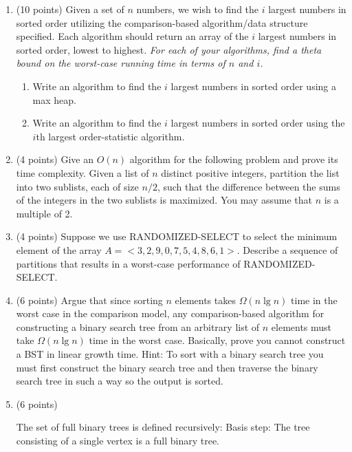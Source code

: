 \documentclass[3]{cs430homework}
\begin{document}
\maketitle

\begin{enumerate}[label=\arabic*.]
	\item (10 points) Given a set of $n$ numbers, we wish to find the $i$ largest numbers in sorted order utilizing the comparison-based algorithm/data structure specified. Each algorithm should return an array of the $i$ largest numbers in sorted order, lowest to highest. \emph{For each of your algorithms, find a theta bound on the worst-case running time in terms of $n$ and $i$.}
	\begin{enumerate}[label=\arabic{enumi}\alph*)]
	    \item Write an algorithm to find the $i$ largest numbers in sorted order using a max heap.
		\item Write an algorithm to find the $i$ largest numbers in sorted order using the $i$th largest order-statistic algorithm.
	\end{enumerate}
	\item (4 points) Give an $O(n)$ algorithm for the following problem and prove its time complexity. Given a list of $n$ distinct positive integers, partition the list into two sublists, each of size $n/2$, such that the difference between the sums of the integers in the two sublists is maximized. You may assume that $n$ is a multiple of 2.
	\item (4 points) Suppose we use RANDOMIZED-SELECT to select the minimum element of the array $A=<3,2,9,0,7,5,4,8,6,1>$. Describe a sequence of partitions that results in a worst-case performance of RANDOMIZED-SELECT.
	\item (6 points) Argue that since sorting $n$ elements takes $\Omega(n \lg n)$ time in the worst case in the comparison model, any comparison-based algorithm for constructing a binary search tree from an arbitrary list of $n$ elements must take $\Omega(n \lg n)$ time in the worst case. Basically, prove you cannot construct a BST in linear growth time. Hint: To sort with a binary search tree you must first construct the binary search tree and then traverse the binary search tree in such a way so the output is sorted.
	\item (6 points)\\
\begin{minipage}{0.6\textwidth}
The set of full binary trees is defined recursively: Basis step: The tree consisting of a single vertex is a full binary tree.\\


\end{minipage}
\end{enumerate}
\end{document}
